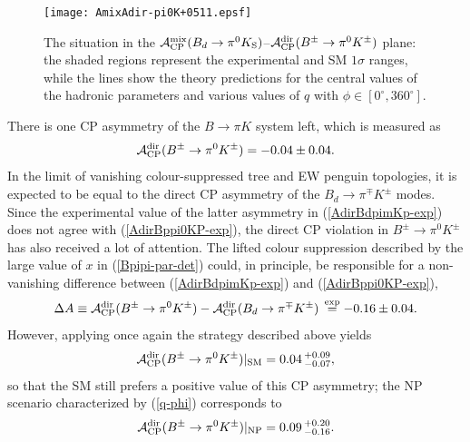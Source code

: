 \documentclass[12pt]{article}
\begin{document}
\begin{figure}
\begin{center}
\texttt{[image: AmixAdir-pi0K+0511.epsf]}
\end{center}
\vspace*{-0.5truecm}
\caption{The situation in the 
${\cal A}_{\rm CP}^{\rm mix}(B_d\to\pi^0K_{\rm S})$--${\cal A}_{\rm CP}^{\rm dir}
(B^\pm\to\pi^0K^\pm)$ plane:  the shaded regions represent the experimental
and SM $1 \sigma$ ranges, while the lines show the
theory predictions for the central values of the hadronic parameters
and various values of $q$ with 
$\phi\in[0^\circ,360^\circ]$.\label{fig:Adirpi0KS-Amixpi0K+}}
\end{figure}

There is one CP asymmetry of the $B\to\pi K$ system left,  
which is measured as 
\begin{equation}\label{AdirBppi0KP-exp}
{\cal A}_{\rm CP}^{\rm dir}(B^\pm\to\pi^0K^\pm) =
-0.04\pm 0.04.
\end{equation}
In the limit of vanishing colour-suppressed tree and EW penguin topologies,
it is expected to be equal to the direct CP asymmetry of the $B_d\to\pi^\mp K^\pm$
modes. Since the experimental value of the latter asymmetry in 
(\ref{AdirBdpimKp-exp}) does not agree with (\ref{AdirBppi0KP-exp}), the 
direct CP violation in $B^\pm\to\pi^0K^\pm$ has also received
a lot of attention. The lifted colour suppression described by the large value of 
$x$ in (\ref{Bpipi-par-det}) could, in principle, be responsible for a non-vanishing
difference between (\ref{AdirBdpimKp-exp}) and (\ref{AdirBppi0KP-exp}),
\begin{equation}
\Delta A \equiv {\cal A}_{\rm CP}^{\rm dir}(B^\pm\to\pi^0K^\pm)
               -{\cal A}_{\rm CP}^{\rm dir}(B_d\to\pi^\mp K^\pm)\,\stackrel{{\rm exp}}{=} 
                -0.16\pm0.04.  \label{DeltaA}
\end{equation}
However, applying once again the strategy described above yields
\begin{equation}\label{AdirBppi0KP-SM}
{\cal A}_{\rm CP}^{\rm dir}(B^\pm\to\pi^0K^\pm)|_{\rm SM} 
= 0.04\,^{+0.09}_{-0.07},
\end{equation}
so that the SM still prefers a positive value of this CP asymmetry; 
the NP scenario characterized by (\ref{q-phi}) corresponds to 
\begin{equation}\label{AdirBppi0KP-NP}
{\cal A}_{\rm CP}^{\rm dir}(B^\pm\to\pi^0K^\pm)|_{\rm NP}
= 0.09\,^{+0.20}_{-0.16}.
\end{equation}
\end{document}
